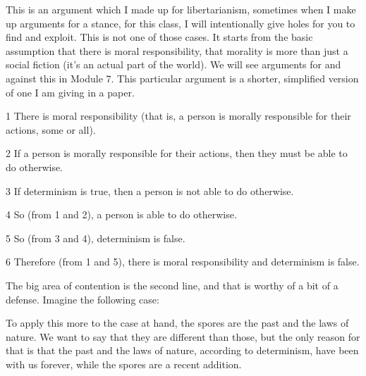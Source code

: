 This is an argument which I made up for libertarianism, sometimes when I make up arguments for a stance, for this class, I will intentionally give holes for you to find and exploit. This is not one of those cases. It starts from the basic assumption that there is moral responsibility, that morality is more than just a social fiction (it's an actual part of the world). We will see arguments for and against this in Module 7. This particular argument is a shorter, simplified version of one I am giving in a paper.
\begin{earg}
    \item[1] There is moral responsibility (that is, a person is morally responsible for their actions, some or all).
    \item[2] If a person is morally responsible for their actions, then they must be able to do otherwise.
    \item[3] If determinism is true, then a person is not able to do otherwise.
    \item[4] So (from 1 and 2), a person is able to do otherwise.
    \item[5] So (from 3 and 4), determinism is false.
    \item[6] Therefore (from 1 and 5), there is moral responsibility and determinism is false.
\end{earg}
The big area of contention is the second line, and that is worthy of a bit of a defense. Imagine the following case:


To apply this more to the case at hand, the spores are the past and the laws of nature. We want to say that they are different than those, but the only reason for that is that the past and the laws of nature, according to determinism, have been with us forever, while the spores are a recent addition.

